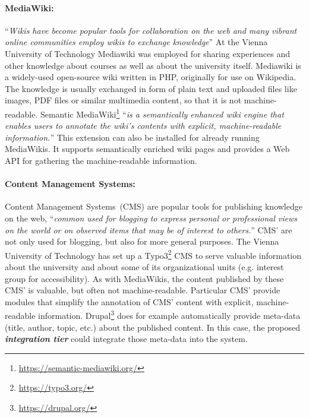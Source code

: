 \documentclass{article}
\begin{document}
\paragraph{MediaWiki:} ``\textit{Wikis have become popular tools for collaboration on the web and many vibrant online communities employ wikis to exchange knowledge}'' \cite{krotzsch_semantic_2006} At the Vienna University of Technology Mediawiki was employed for sharing experiences and other knowledge about courses as well as about the university itself. Mediawiki is a widely-used open-source wiki written in PHP, originally for use on Wikipedia. The knowledge is usually exchanged in form of plain text and uploaded files like images, PDF files or similar multimedia content, so that it is not machine-readable. Semantic MediaWiki\footnote{\url{https://semantic-mediawiki.org/}} ``\textit{is a semantically enhanced wiki engine that enables users to annotate the wiki’s contents with explicit, machine-readable information.}''\cite{krotzsch_semantic_2006} This extension can also be installed for already running MediaWikis. It supports semantically enriched wiki pages and provides a Web API for gathering the machine-readable information. 

\paragraph{Content Management Systems:} Content Management Systems~(CMS) are popular tools for publishing knowledge on the web, ``\textit{common used for blogging to express personal or professional views on the world or on observed items that may be of interest to others.}''\cite{bojars_using_2006} CMS' are not only used for blogging, but also for more general purposes. The Vienna University of Technology has set up a Typo3\footnote{\url{https://typo3.org/}} CMS to serve valuable information about the university and about some of its organizational units (e.g. interest group for accessibility). As with MediaWikis, the content published by these CMS' is valuable, but often not machine-readable. Particular CMS' provide modules that simplify the annotation of CMS' content with explicit, machine-readable information. Drupal\footnote{\url{https://drupal.org/}} does for example automatically provide meta-data (title, author, topic, etc.) about the published content. In this case, the proposed \textbf{\textit{integration tier}} could integrate those meta-data into the system.
\end{document}

